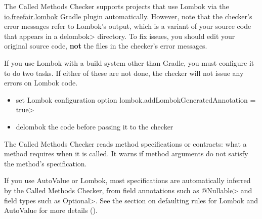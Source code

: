 The Called Methods Checker supports projects that use Lombok via
the \href{https://plugins.gradle.org/plugin/io.freefair.lombok}{io.freefair.lombok} Gradle plugin automatically.
However, note that the checker's error messages refer to Lombok's output, which is a variant of your source code
that appears in a \<delombok> directory.
To fix issues, you should edit your original source code, \textbf{not} the files in the checker's error messages.

If you use Lombok with a build system other than Gradle, you must configure it to do two tasks.
If either of these are not done, the checker will not issue any errors on Lombok code.
\begin{itemize}
\item set Lombok configuration option \<lombok.addLombokGeneratedAnnotation = true>
\item delombok the code before passing it to the checker
\end{itemize}


The Called Methods Checker reads method specifications or contracts:  what a method requires when it is called.
It warns if method arguments do not satisfy the method's specification.

If you use AutoValue or Lombok, most specifications are automatically
inferred by the Called Methods Checker, from field annotations such as
\<@Nullable> and field types such as \<Optional>. See the
section on defaulting rules for Lombok and AutoValue for more details
().

